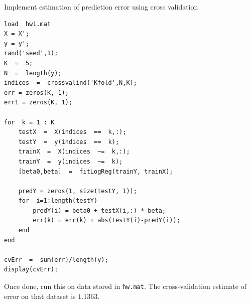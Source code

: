 \documentclass{article}
\begin{document}
\newproblem{1pt}
Implement estimation of prediction error using cross validation
\begin{verbatim}
load  hw1.mat
X = X';
y = y';
rand('seed',1);
K  =  5;
N  =  length(y);
indices  =  crossvalind('Kfold',N,K);
err = zeros(K, 1);
err1 = zeros(K, 1);

for  k = 1 : K
    testX  =  X(indices  ==  k,:);
    testY  =  y(indices  ==  k);    
    trainX  =  X(indices  ~=  k,:);
    trainY  =  y(indices  ~=  k);    
    [beta0,beta]  =  fitLogReg(trainY, trainX);    
    
    predY = zeros(1, size(testY, 1));
    for  i=1:length(testY)
        predY(i) = beta0 + testX(i,:) * beta;        
        err(k) = err(k) + abs(testY(i)-predY(i));
    end   
end

cvErr  =  sum(err)/length(y);
display(cvErr);
\end{verbatim}
Once done, run this on data stored in \texttt{hw\theHW.mat}. The cross-validation estimate of error on that dataset is $1.1363$.
\end{document}
